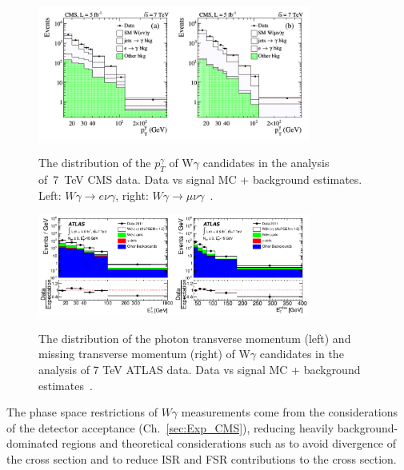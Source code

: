 \begin{figure}[htb]
  \begin{center}
    {\includegraphics[width=0.80\textwidth]{../figs/WgAbout/Wg7TeV_CMS_ptGamma.png}}
    \caption{The distribution of the $p_T^\gamma$ of W$\gamma$ candidates in the analysis of~7~TeV CMS data. Data vs signal MC + background estimates. Left: $W\gamma\rightarrow e\nu\gamma$, right: $W\gamma\rightarrow \mu\nu\gamma$~\cite{ref_7TeV_CMS}.}
    \label{fig:Wg7TeV_CMS_ptGamma}
  \end{center}
\end{figure}

\begin{figure}[htb]
  \begin{center}
    {\includegraphics[width=0.80\textwidth]{../figs/WgAbout/Wg7TeV_ATLAS_ptGamma.png}}
    \caption{The distribution of the photon transverse momentum (left) and missing transverse momentum (right) of W$\gamma$ candidates in the analysis of 7 TeV ATLAS data. Data vs signal MC + background estimates~\cite{ref_7TeV_ATLAS}. }
    \label{fig:Wg7TeV_ATLAS_ptGamma}
  \end{center}
\end{figure}

The phase space restrictions of $W\gamma$ measurements come from the considerations of the detector acceptance (Ch.~\ref{sec:Exp_CMS}), reducing heavily background-dominated regions and theoretical considerations such as to avoid divergence of the cross section and to reduce ISR and FSR contributions to the cross section.

